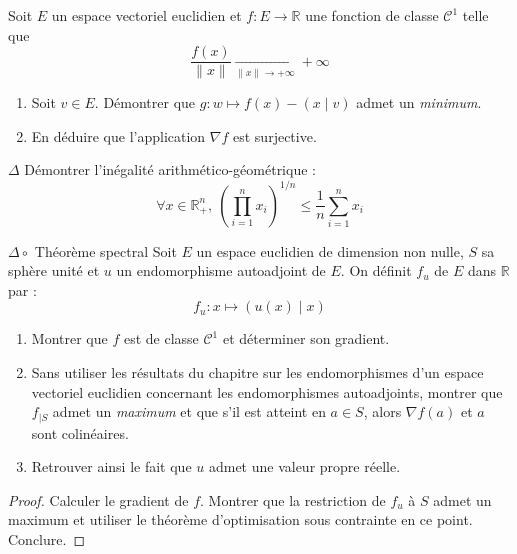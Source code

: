 \documentclass[french,a4paper]{article}
\newcommand{\R}{\mathbb{R}}
\theoremstyle{plain}
\theoremstyle{definition}
\theoremstyle{remark}
\begin{document}
\begin{ex}[Moulin.51]{}
	Soit $E$ un espace vectoriel euclidien et $f:E\to\R$ une fonction de classe $\mathcal{C}^1$ telle que $$\frac{f(x)}{\lVert x\rVert}\xrightarrow[\lVert x\rVert\to+\infty]{}+\infty$$
	\begin{enumerate}
		\item Soit $v\in E$. Démontrer que $g:w\mapsto f(x)-(x\mid v)$ admet un \textit{minimum}.
		\item En déduire que l'application $\nabla f$ est surjective.
	\end{enumerate}
\end{ex}

\begin{ex}[Moulin.51]{$\Delta$}
	Démontrer l'inégalité arithmético-géométrique : $$\forall x\in\R_+^n,\ \left(\prod_{i=1}^{n}x_i\right)^{1/n}\leqslant\frac{1}{n}\sum_{i=1}^{n}x_i$$
\end{ex}

\begin{ex}[Moulin.53]{$\Delta\circ$ Théorème spectral}
	Soit $E$ un espace euclidien de dimension non nulle, $S$ sa sphère unité et $u$ un endomorphisme autoadjoint de $E$. On définit $f_u$ de $E$ dans $\R$ par : $$f_u:x\mapsto (u(x)\mid x)$$
	\begin{enumerate}
		\item Montrer que $f$ est de classe $\mathcal{C}^1$ et déterminer son gradient.
		\item Sans utiliser les résultats du chapitre sur les endomorphismes d'un espace vectoriel euclidien concernant les endomorphismes autoadjoints, montrer que $f_{\mid S}$ admet un \textit{maximum} et que s'il est atteint en $a\in S$, alors $\nabla f(a)$ et $a$ sont colinéaires.
		\item Retrouver ainsi le fait que $u$ admet une valeur propre réelle.
	\end{enumerate}
\end{ex}
\begin{proof}
	Calculer le gradient de $f$. Montrer que la restriction de $f_u$ à $S$ admet un maximum et utiliser le théorème d'optimisation sous contrainte en ce point. Conclure. 
\end{proof}
\end{document}
